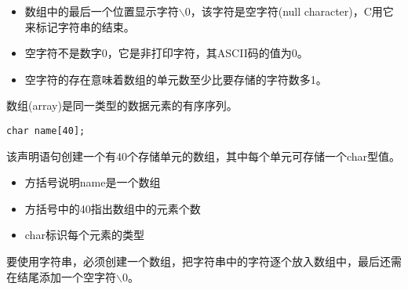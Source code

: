 \begin{frame}[fragile]\ft{\secname}
\begin{itemize}
\item 数组中的最后一个位置显示字符$\backslash$0，该字符是空字符(null character)，C用它来标记字符串的结束。\\[0.15in]
\item 空字符不是数字0，它是非打印字符，其ASCII码的值为0。\\[0.15in]
\item 空字符的存在意味着数组的单元数至少比要存储的字符数多1。
\end{itemize}

\end{frame}


\begin{frame}\ft{\secname}
\begin{dingyi}
\textcolor{acolor1}{数组(array)}是同一类型的数据元素的有序序列。
\end{dingyi}
\end{frame}


\begin{frame}[fragile]
\begin{lstlisting}[backgroundcolor=\color{red!10}]
char name[40];
\end{lstlisting}
该声明语句创建一个有40个存储单元的数组，其中每个单元可存储一个char型值。
\pause \vspace{0.1in}

\begin{itemize}
\item 方括号说明name是一个数组\\[0.1in]
\item 方括号中的40指出数组中的元素个数\\[0.1in]
\item char标识每个元素的类型
\end{itemize}
\end{frame}


\begin{frame}[fragile]
要使用字符串，必须创建一个数组，把字符串中的字符逐个放入数组中，最后还需在结尾添加一个空字符$\backslash$0。
\end{frame}

\begin{frame}[fragile]

\end{frame}

